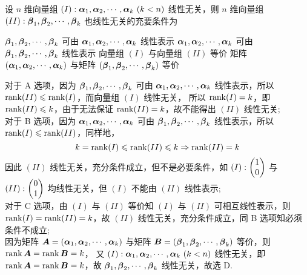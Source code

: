 \begin{example}
    设 $n$ 维向量组 $(I):\vb*{\alpha}_1,\vb*{\alpha}_2,\cdots,\vb*{\alpha}_k~ (k<n)$ 线性无关，则 $n$ 维向量组 $(II):\vb*{\beta}_1,\vb*{\beta}_2,\cdots,\vb*{\beta}_k$ 也线性无关的充要条件为
    \begin{tasks}
        \task $\vb*{\beta}_1,\vb*{\beta}_2,\cdots,\vb*{\beta}_k$ 可由 $\vb*{\alpha}_1,\vb*{\alpha}_2,\cdots,\vb*{\alpha}_k$ 线性表示
        \task $\vb*{\alpha}_1,\vb*{\alpha}_2,\cdots,\vb*{\alpha}_k$ 可由 $\vb*{\beta}_1,\vb*{\beta}_2,\cdots,\vb*{\beta}_k$ 线性表示
        \task 向量组 $(I)$ 与向量组 $(II)$ 等价
        \task 矩阵 $(\vb*{\alpha}_1,\vb*{\alpha}_2,\cdots,\vb*{\alpha}_k)$ 与矩阵 $(\vb*{\beta}_1,\vb*{\beta}_2,\cdots,\vb*{\beta}_k)$ 等价
    \end{tasks}
\end{example}
\begin{solution}
    对于 A 选项，因为 $\vb*{\beta}_1,\vb*{\beta}_2,\cdots,\vb*{\beta}_k$ 可由 $\vb*{\alpha}_1,\vb*{\alpha}_2,\cdots,\vb*{\alpha}_k$ 线性表示，所以 $\rank(II)\leqslant \rank(I)$，而向量组 $(I)$ 线性无关，
    所以 $\rank(I)=k$，即 $\rank(II)\leqslant k$，由于无法保证 $\rank(II)=k$，故不能得出 $(II)$ 线性无关;\\
    对于 B 选项，因为 $\vb*{\alpha}_1,\vb*{\alpha}_2,\cdots,\vb*{\alpha}_k$ 可由 $\vb*{\beta}_1,\vb*{\beta}_2,\cdots,\vb*{\beta}_k$ 线性表示，所以 $\rank(I)\leqslant \rank(II)$，同样地，
    $$k=\rank(I)\leqslant\rank(II)\leqslant k\Rightarrow \rank(II)=k$$
    因此 $(II)$ 线性无关，充分条件成立，但不是必要条件，如 $(I):\mqty(1\\0)$ 与 $(II):\mqty(0\\1)$ 均线性无关，但 $(I)$ 不能由 $(II)$ 线性表示;\\
    对于 C 选项，由 $(I)$ 与 $(II)$ 等价知 $(I)$ 与 $(II)$ 可相互线性表示，则 $\rank(I)=\rank(II)=k$，故 $(II)$ 线性无关，充分条件成立，同 B 选项知必须条件不成立;\\
    因为矩阵 $\vb*{A}=(\vb*{\alpha}_1,\vb*{\alpha}_2,\cdots,\vb*{\alpha}_k)$ 与矩阵 $\vb*{B}=(\vb*{\beta}_1,\vb*{\beta}_2,\cdots,\vb*{\beta}_k)$ 等价，则 $\rank\vb*{A}=\rank\vb*{B}=k$，
    又 $(I):\vb*{\alpha}_1,\vb*{\alpha}_2,\cdots,\vb*{\alpha}_k~ (k<n)$ 线性无关，即 $\rank\vb*{A}=\rank\vb*{B}=k$，故 $\vb*{\beta}_1,\vb*{\beta}_2,\cdots,\vb*{\beta}_k$ 线性无关，故选 D.
\end{solution}

